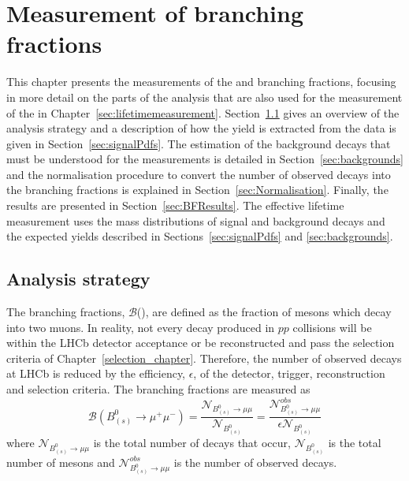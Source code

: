\chapter{\bf{Measurement of }\boldmath{\bmumu}\bf{ branching fractions}}
\label{sec:BFanalysis}
This chapter presents the measurements of the \bdmumu and \bsmumu branching fractions, focusing in more detail on the parts of the analysis that are also used for the measurement of the \bsmumu \el in Chapter~\ref{sec:lifetimemeasurement}. Section~\ref{sec:BFAnalysisStrategy} gives an overview of the analysis strategy and a description of how the \bmumu yield is extracted from the data is given in Section~\ref{sec:signalPdfs}. The estimation of the background decays that must be understood for the \BF measurements is detailed in Section~\ref{sec:backgrounds} and the normalisation procedure to convert the number of observed \bmumu decays into the branching fractions is explained in Section~\ref{sec:Normalisation}. Finally, the results are presented in Section~\ref{sec:BFResults}. 
The \bsmumu effective lifetime measurement uses the mass distributions of signal and background decays and the expected yields described in Sections~\ref{sec:signalPdfs} and \ref{sec:backgrounds}. 

\section{Analysis strategy} 
\label{sec:BFAnalysisStrategy}
The \bmumu branching fractions, $\mathcal{B}$(\bmumu), are defined as the fraction of \bsd mesons which decay into two muons.
In reality, not every \bmumu decay produced in $pp$ collisions will be within the LHCb detector acceptance or be reconstructed and pass the selection criteria of Chapter~\ref{selection_chapter}. Therefore, the number of observed \bmumu decays at LHCb is reduced by the efficiency, $\epsilon$, of the detector, trigger, reconstruction and selection criteria.
The \bmumu branching fractions are measured as
\begin{equation}
\mathcal{B}(B^{0}_{(s)} \to \mu^{+} \mu^{-}) = \frac{\mathcal{N}_{B^{0}_{(s)} \to \mu \mu}}{\mathcal{N}_{B^{0}_{(s)}}} = \frac{ \mathcal{N}^{obs}_{B^{0}_{(s)} \to \mu \mu}}{ \epsilon \mathcal{N}_{B^{0}_{(s)}}}
\label{eq:BFdef}
\end{equation}
where $\mathcal{N}_{B^{0}_{(s)} \to \mu \mu}$ is the total number of \bmumu decays that occur, $\mathcal{N}_{B^{0}_{(s)}}$ is the total number of \bsd mesons and $\mathcal{N}^{obs}_{B^{0}_{(s)} \to \mu \mu}$ is the number of observed \bmumu decays.


